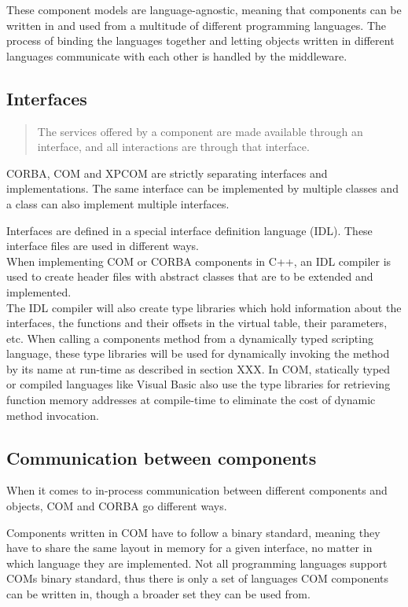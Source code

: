 These component models are language-agnostic, meaning that components can be written in and used from a multitude of different programming languages. The process of binding the languages together and letting objects written in different languages communicate with each other is handled by the middleware.

\subsection{Interfaces}

\begin{quotation}
The services offered by a component are made available through an interface, and all interactions are through that interface.
\end{quotation}

CORBA, COM and XPCOM are strictly separating interfaces and implementations. The same interface can be implemented by multiple classes and a class can also implement multiple interfaces.

Interfaces are defined in a special interface definition language (IDL). These interface files are used in different ways.\\
When implementing COM or CORBA components in C++, an IDL compiler is used to create header files with abstract classes that are to be extended and implemented.\\
The IDL compiler will also create type libraries which hold information about the interfaces, the functions and their offsets in the virtual table, their parameters, etc. When calling a components method from a dynamically typed scripting language, these type libraries will be used for dynamically invoking the method by its name at run-time as described in section XXX.  In COM, statically typed or compiled languages like Visual Basic also use the type libraries for retrieving function memory addresses at compile-time to eliminate the cost of dynamic method invocation.

\subsection{Communication between components}

When it comes to in-process communication between different components and objects, COM and CORBA go different ways. 

Components written in COM have to follow a binary standard, meaning they have to share the same layout in memory for a given interface, no matter in which language they are implemented. Not all programming languages support COMs binary standard, thus there is only a set of languages COM components can be written in, though a broader set they can be used from.

